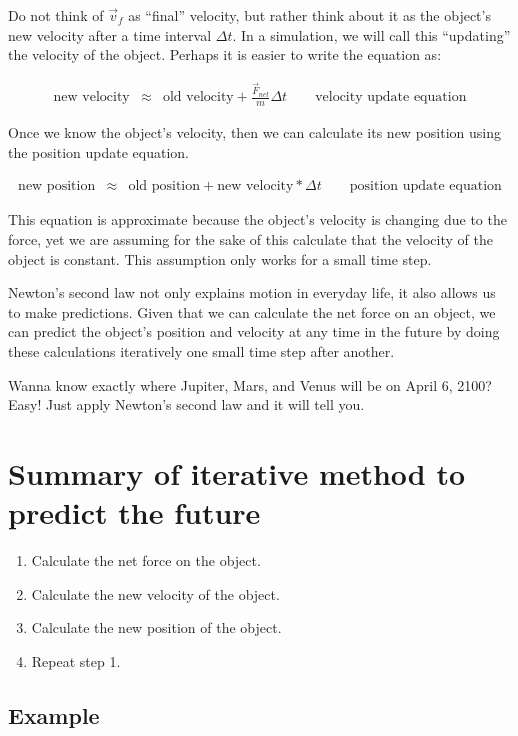 Do not think of $\vec{v}_f$ as ``final'' velocity, but rather think about it as the object's new velocity after a time interval $\Delta t$. In a simulation, we will call this ``updating'' the velocity of the object. Perhaps it is easier to write the equation as:

\begin{eqnarray*}
	\mbox{new velocity} & \approx & \mbox{old velocity} +  \frac{\vec{F}_{net}}{m}\Delta t \qquad \mbox{velocity update equation}
\end{eqnarray*}

Once we know the object's velocity, then we can calculate its new position using the position update equation.

\begin{eqnarray*}
	\mbox{new position} & \approx & \mbox{old position} +   \mbox{new velocity}*\Delta t \qquad \mbox{position update equation}
\end{eqnarray*}

This equation is approximate because the object's velocity is changing due to the force, yet we are assuming for the sake of this calculate that the velocity of the object is constant. This assumption only works for a small time step.

Newton's second law not only explains motion in everyday life, it also allows us to make predictions. Given that we can calculate the net force on an object, we can predict the object's position and velocity at any time in the future by doing these calculations iteratively one small time step after another. 

Wanna know exactly where Jupiter, Mars, and Venus will be on April 6, 2100?  Easy! Just apply Newton's second law and it will tell you.

\section*{Summary of iterative method to predict the future}

\begin{enumerate}
	\item Calculate the net force on the object.
	\item Calculate the new velocity of the object.
	\item Calculate the new position of the object.
	\item Repeat step 1.
\end{enumerate}

\subsection*{Example}

